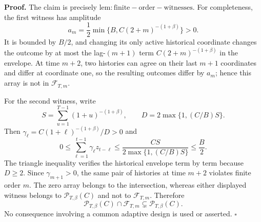 \textbf{Proof.} The claim is precisely \(\mathrm{lem:finite-order-witnesses}\). For completeness, the first witness has amplitude
\[
a_m=\frac12\min\{B,C(2+m)^{-(1+\beta)}\}>0.
\]
It is bounded by \(B/2\), and changing its only active historical coordinate changes the outcome by at most the lag-\((m+1)\) term \(C(2+m)^{-(1+\beta)}\) in the envelope. At time \(m+2\), two histories can agree on their last \(m+1\) coordinates and differ at coordinate one, so the resulting outcomes differ by \(a_m\); hence this array is not in \(\mathcal F_{T,m}\).

For the second witness, write
\[
S=\sum_{u=1}^{T-1}(1+u)^{-(1+\beta)},
\qquad
D=2\max\{1,(C/B)S\}.
\]
Then \(\gamma_\ell=C(1+\ell)^{-(1+\beta)}/D>0\) and
\[
0\le \sum_{\ell=1}^{t-1}\gamma_\ell z_{t-\ell}
\le \frac{CS}{2\max\{1,(C/B)S\}}
\le \frac B2.
\]
The triangle inequality verifies the historical envelope term by term because \(D\ge2\). Since \(\gamma_{m+1}>0\), the same pair of histories at time \(m+2\) violates finite order \(m\). The zero array belongs to the intersection, whereas either displayed witness belongs to \(\mathcal P_{T,\beta}(C)\) and not to \(\mathcal F_{T,m}\). Therefore
\[
\mathcal P_{T,\beta}(C)\cap\mathcal F_{T,m}
\subsetneq \mathcal P_{T,\beta}(C).
\]
No consequence involving a common adaptive design is used or asserted. \(\square\)